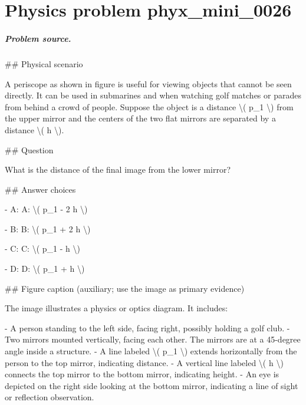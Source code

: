 
\chapter{Physics problem phyx\_mini\_0026}
\label{ch:PhyXMiniProblems_problem_phyx_mini_0026}

\paragraph{Problem source.}
\#\# Physical scenario

A periscope as shown in figure is useful for viewing objects that cannot be seen directly. It can be used in submarines and when watching golf matches or parades from behind a crowd of people. Suppose the object is a distance \textbackslash{}( p\_1 \textbackslash{}) from the upper mirror and the centers of the two flat mirrors are separated by a distance \textbackslash{}( h \textbackslash{}).

\#\# Question

What is the distance of the final image from the lower mirror?

\#\# Answer choices

- A: A: \textbackslash{}( p\_1 - 2 h \textbackslash{})

- B: B: \textbackslash{}( p\_1 + 2 h \textbackslash{})

- C: C: \textbackslash{}( p\_1 - h \textbackslash{})

- D: D: \textbackslash{}( p\_1 + h \textbackslash{})

\#\# Figure caption (auxiliary; use the image as primary evidence)

The image illustrates a physics or optics diagram. It includes:

- A person standing to the left side, facing right, possibly holding a golf club.
- Two mirrors mounted vertically, facing each other. The mirrors are at a 45-degree angle inside a structure.
- A line labeled \textbackslash{}( p\_1 \textbackslash{}) extends horizontally from the person to the top mirror, indicating distance.
- A vertical line labeled \textbackslash{}( h \textbackslash{}) connects the top mirror to the bottom mirror, indicating height.
- An eye is depicted on the right side looking at the bottom mirror, indicating a line of sight or reflection observation.

